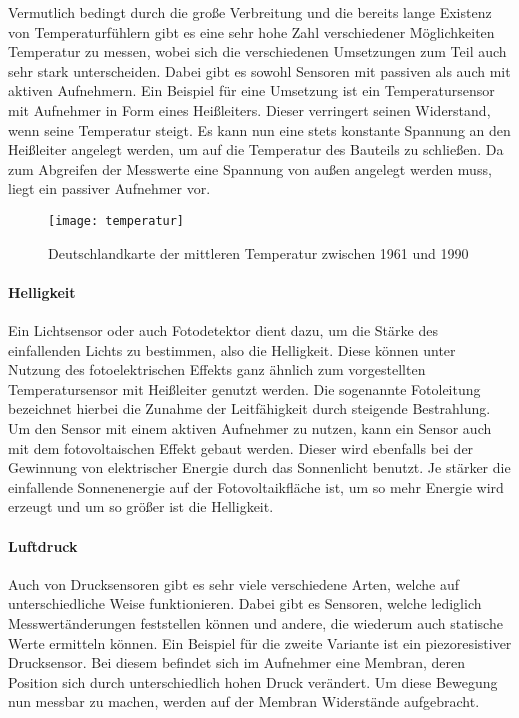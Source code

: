 Vermutlich bedingt durch die große Verbreitung und die bereits lange Existenz von Temperaturfühlern gibt es eine sehr hohe Zahl verschiedener Möglichkeiten Temperatur zu messen, wobei sich die verschiedenen Umsetzungen zum Teil auch sehr stark unterscheiden. Dabei gibt es sowohl Sensoren mit passiven als auch mit aktiven Aufnehmern.\newline
Ein Beispiel für eine Umsetzung ist ein Temperatursensor mit Aufnehmer in Form eines Heißleiters. Dieser verringert seinen Widerstand, wenn seine Temperatur steigt. Es kann nun eine stets konstante Spannung an den Heißleiter angelegt werden, um auf die Temperatur des Bauteils zu schließen. Da zum Abgreifen der Messwerte eine Spannung von außen angelegt werden muss, liegt ein passiver Aufnehmer vor.

\begin{figure}[htbp]
\centering
\caption{Deutschlandkarte der mittleren Temperatur zwischen 1961 und 1990}
\label{fig:temperatur}
\texttt{[image: temperatur]}
\end{figure}

\paragraph{Helligkeit}

Ein Lichtsensor oder auch Fotodetektor dient dazu, um die Stärke des einfallenden Lichts zu bestimmen, also die Helligkeit. Diese können unter Nutzung des fotoelektrischen Effekts ganz ähnlich zum vorgestellten Temperatursensor mit Heißleiter genutzt werden. Die sogenannte Fotoleitung bezeichnet hierbei die Zunahme der Leitfähigkeit durch steigende Bestrahlung. Um den Sensor mit einem aktiven Aufnehmer zu nutzen, kann ein Sensor auch mit dem fotovoltaischen Effekt gebaut werden. Dieser wird ebenfalls bei der Gewinnung von elektrischer Energie durch das Sonnenlicht benutzt. Je stärker die einfallende Sonnenenergie auf der Fotovoltaikfläche ist, um so mehr Energie wird erzeugt und um so größer ist die Helligkeit.

\newpage
\paragraph{Luftdruck}

Auch von Drucksensoren gibt es sehr viele verschiedene Arten, welche auf unterschiedliche Weise funktionieren. Dabei gibt es Sensoren, welche lediglich Messwertänderungen feststellen können und andere, die wiederum auch statische Werte ermitteln können. Ein Beispiel für die zweite Variante ist ein piezoresistiver Drucksensor. Bei diesem befindet sich im Aufnehmer eine Membran, deren Position sich durch unterschiedlich hohen Druck verändert. Um diese Bewegung nun messbar zu machen, werden auf der Membran Widerstände aufgebracht.

